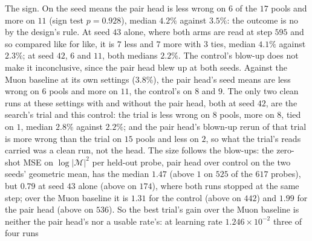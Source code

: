 \documentclass[11pt]{article}
\begin{document}
\begin{itemize}
    The sign. On the seed means the pair head is less wrong on $6$ of the $17$ pools and more on $11$ (sign test
    $p=0.928$), median $4.2\%$ against $3.5\%$: the outcome is no by the design's rule. At seed $43$ alone, where both
    arms are read at step $595$ and so compared like for like, it is $7$ less and $7$ more with $3$ ties, median $4.1\%$
    against $2.3\%$; at seed $42$, $6$ and $11$, both medians $2.2\%$. The control's blow-up does not make it
    inconclusive, since the pair head blew up at both seeds.
    Against the Muon baseline at its own settings ($3.8\%$), the pair head's seed means are less wrong on $6$ pools
    and more on $11$, the control's on $8$ and $9$. The only two clean runs at these settings with and without the pair
    head, both at seed $42$, are the search's trial and this control: the trial is less wrong on $8$ pools, more on $8$,
    tied on $1$, median $2.8\%$ against $2.2\%$; and the pair head's blown-up rerun of that trial is more wrong than
    the trial on $15$ pools and less on $2$, so what the trial's reads carried was a clean run, not the head. The size
    follows the blow-ups: the zero-shot MSE on $\log|\mathcal M|^2$ per held-out probe, pair head over control on the
    two seeds' geometric mean, has the median $1.47$ (above $1$ on $525$ of the $617$ probes), but $0.79$ at seed $43$
    alone (above on $174$), where both runs stopped at the same step; over the Muon baseline it is $1.31$ for the
    control (above on $442$) and $1.99$ for the pair head (above on $536$). So the best trial's gain over the Muon
    baseline is neither the pair head's nor a usable rate's: at learning rate $1.246\times10^{-2}$ three of four runs

\end{itemize}
\end{document}
